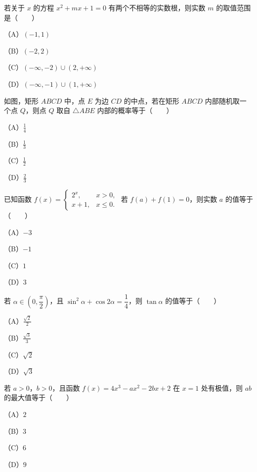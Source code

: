 \begin{question}
若关于 $x$ 的方程 $x^2+mx+1=0$ 有两个不相等的实数根，则实数 $m$ 的取值范围是\mbox{（　　）}

（A）$(-1,1)$

（B）$(-2,2)$

（C）$(-\infty,-2)\cup(2,+\infty)$

（D）$(-\infty,-1)\cup(1,+\infty)$

\Needspace{0.4\textheight}
\end{question}
\begin{question}
如图，矩形 $ABCD$ 中，点 $E$ 为边 $CD$ 的中点，若在矩形 $ABCD$ 内部随机取一个点 $Q$，则点 $Q$ 取自 $\triangle ABE$ 内部的概率等于\mbox{（　　）}

（A）$\frac14$

（B）$\frac13$

（C）$\frac12$

（D）$\frac23$
\nopagebreak[4]
\begin{center}\end{center}
\nopagebreak[4]
\end{question}
\begin{question}
已知函数 $f(x)=\begin{cases}2^x,&x>0,\\x+1,&x\leqslant0.\end{cases}$ 若 $f(a)+f(1)=0$，则实数 $a$ 的值等于\mbox{（　　）}

（A）$-3$

（B）$-1$

（C）$1$

（D）$3$

\end{question}
\begin{question}
若 $\alpha\in\left(0,\dfrac\pi2\right)$，且 $\sin^2\alpha+\cos2\alpha=\dfrac14$，则 $\tan\alpha$ 的值等于\mbox{（　　）}

（A）$\frac{\sqrt2}2$

（B）$\frac{\sqrt3}3$

（C）$\sqrt2$

（D）$\sqrt3$

\end{question}
\begin{question}
若 $a>0$，$b>0$，且函数 $f(x)=4x^3-ax^2-2bx+2$ 在 $x=1$ 处有极值，则 $ab$ 的最大值等于\mbox{（　　）}

（A）$2$

（B）$3$

（C）$6$

（D）$9$

\end{question}
